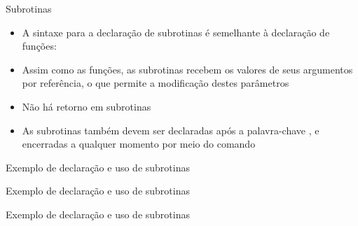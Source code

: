 \begin{frame}[fragile]{Subrotinas}

    \begin{itemize}
        \item A sintaxe para a declaração de subrotinas é semelhante à declaração de funções:


        \item Assim como as funções, as subrotinas recebem os valores de seus argumentos por
            referência, o que permite a modificação destes parâmetros

        \item Não há retorno em subrotinas

        \item As subrotinas também devem ser declaradas após a palavra-chave 
            , e encerradas a qualquer momento por meio do comando

    \end{itemize}

\end{frame}

\begin{frame}[fragile]{Exemplo de declaração e uso de subrotinas}
\end{frame}

\begin{frame}[fragile]{Exemplo de declaração e uso de subrotinas}
\end{frame}

\begin{frame}[fragile]{Exemplo de declaração e uso de subrotinas}
\end{frame}


